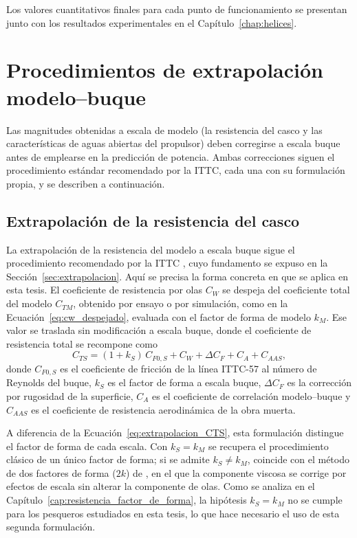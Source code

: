 Los valores cuantitativos finales para cada punto de funcionamiento se presentan junto con los resultados experimentales en el Capítulo~\ref{chap:helices}.

\section{Procedimientos de extrapolación modelo--buque}
\label{sec:extrapolacion_general}

Las magnitudes obtenidas a escala de modelo (la resistencia del casco y las
características de aguas abiertas del propulsor) deben corregirse a escala buque antes
de emplearse en la predicción de potencia. Ambas correcciones siguen el
procedimiento estándar recomendado por la ITTC, cada una con su formulación propia, y
se describen a continuación.

\subsection{Extrapolación de la resistencia del casco}
\label{sec:prediccion_potencia}

La extrapolación de la resistencia del modelo a escala buque sigue el
procedimiento recomendado por la ITTC \citep{ITTC_Performance_prediction}, cuyo
fundamento se expuso en la Sección~\ref{sec:extrapolacion}. Aquí se precisa la
forma concreta en que se aplica en esta tesis. El coeficiente de resistencia por
olas $C_W$ se despeja del coeficiente total del modelo $C_{TM}$, obtenido por
ensayo o por simulación, como en la Ecuación~\eqref{eq:cw_despejado}, evaluada
con el factor de forma de modelo $k_M$. Ese valor se traslada sin modificación a
escala buque, donde el coeficiente de resistencia total se recompone como
%
\begin{equation}\label{eq:CTS}
    C_{TS} = (1 + k_S)\,C_{F0,S} + C_W + \Delta C_F + C_A + C_{AAS} ,
\end{equation}
%
donde $C_{F0,S}$ es el coeficiente de fricción de la línea ITTC-57 al número de
Reynolds del buque, $k_S$ es el factor de forma a escala buque, $\Delta C_F$ es
la corrección por rugosidad de la superficie, $C_A$ es el coeficiente de
correlación modelo--buque y $C_{AAS}$ es el coeficiente de resistencia
aerodinámica de la obra muerta.

A diferencia de la Ecuación~\eqref{eq:extrapolacion_CTS}, esta formulación
distingue el factor de forma de cada escala. Con $k_S = k_M$ se recupera el
procedimiento clásico de un único factor de forma; si se admite $k_S \neq k_M$,
coincide con el método de dos factores de forma ($2k$) de
\citet{korkmaz_wetted_transom}, en el que la componente viscosa se corrige por
efectos de escala sin alterar la componente de olas. Como se analiza en el
Capítulo~\ref{cap:resistencia_factor_de_forma}, la hipótesis $k_S = k_M$ no se
cumple para los pesqueros estudiados en esta tesis, lo que hace necesario el uso
de esta segunda formulación.

